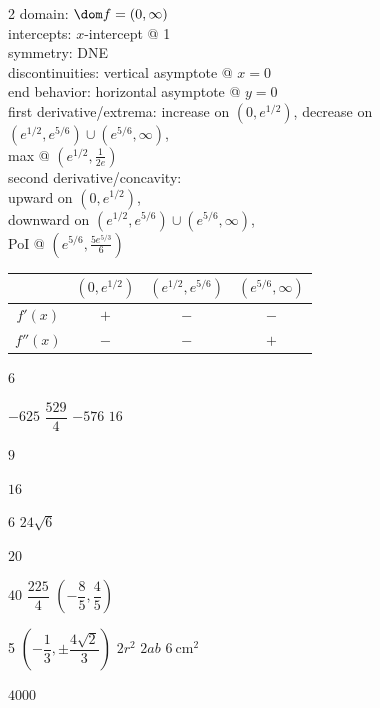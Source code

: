 \documentclass{book}
\begin{document}
\begin{appendices}
\begin{enumerate}[!HW!]
\begin{multicols}{2}
domain: $\dom f = (0, \infty)$ \\
intercepts: $x$-intercept @ 1\\
symmetry: DNE\\ 
discontinuities: vertical asymptote @ $x=0$\\
end behavior: horizontal asymptote @ $y=0$\\
first derivative/extrema: increase on $(0, e^{1/2})$, decrease on $(e^{1/2}, e^{5/6})\cup(e^{5/6},\infty)$,\\ max @ $\left(e^{1/2},\frac{1}{2e}\right)$\\
second derivative/concavity:\\ upward on $(0, e^{1/2})$,\\ downward on $(e^{1/2}, e^{5/6})\cup(e^{5/6},\infty)$,\\ PoI @ $\left(e^{5/6},\frac{5e^{5/3}}{6}\right)$\vspace{-15pt}
\begin{center}
\begin{tabular}{c|c|c|c}
 & $(0, e^{1/2})$ & $(e^{1/2}, e^{5/6})$ & $(e^{5/6},\infty)$ \\ \hline
$f'(x)$ & $+$ & $-$ & $-$ \\ 
$f''(x)$ & $-$ & $-$  & $+$ \\ 
\end{tabular}
\end{center}
\end{multicols}
\end{enumerate}

\begin{enumerate}[!HW!]
\begin{multicols}{6}
\item $-625$
\itemspade $\dfrac{529}{4}$
\itemspade  $-576$
\itemspade  $16$
\item $9$
\item $16$
\end{multicols}
\begin{multicols}{6}
\itemspade  $24\sqrt{6}$
\item $20$
\item  $40$
\itemspade  $\dfrac{225}{4}$
\itemspade  $\left(-\dfrac{8}{5}, \dfrac{4}{5}\right)$
\end{multicols}
\begin{multicols}{5}
\itemspade  $\left(-\dfrac{1}{3}, \pm\dfrac{4\sqrt{2}}{3}\right)$
\itemspade  $2r^2$
\itemspade  $2ab$
\itemspade $6\ \text{cm}^2$
\item  $4000$
\end{multicols}
\end{enumerate}
\vspace{-15pt}


\end{appendices}
\end{document}
